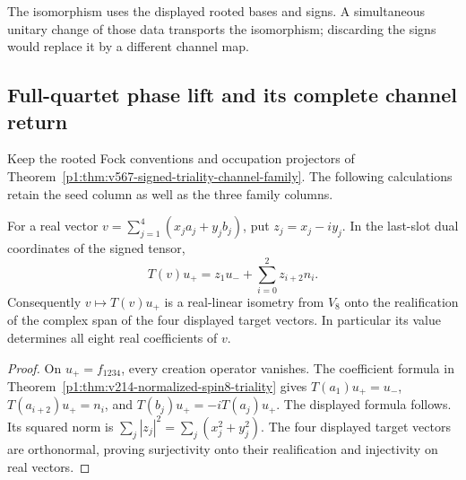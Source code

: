 \documentclass[11pt]{article}
\begin{document}
\begin{remark}
\label{p1:rem:v567-signed-triality-source-firewall}
The isomorphism uses the displayed rooted bases and signs.
A simultaneous unitary change of those data transports the isomorphism;
discarding the signs would replace it by a different channel map.
\end{remark}

\subsection{Full-quartet phase lift and its complete channel return}
\label{p1:sec:v242-signed-phase-lift}
Keep the rooted Fock conventions and occupation projectors of
Theorem~\ref{p1:thm:v567-signed-triality-channel-family}. The following
calculations retain the seed column as well as the three family columns.

\begin{lemma}
\label{p1:lem:v242-seed-real-isometry}
For a real vector
\(v=\sum_{j=1}^4(x_ja_j+y_jb_j)\), put \(z_j=x_j-iy_j\).
In the last-slot dual coordinates of the signed tensor,
\[
 \boxed{T(v)u_+=z_1u_-+\sum_{i=0}^2z_{i+2}n_i.}
\]
Consequently \(v\mapsto T(v)u_+\) is a real-linear isometry from
\(V_8\) onto the realification of the complex span of the four
displayed target vectors.
In particular its value determines all eight real coefficients of \(v\).
\end{lemma}
\begin{proof}
On \(u_+=f_{1234}\), every creation operator vanishes. The coefficient
formula in Theorem~\ref{p1:thm:v214-normalized-spin8-triality} gives
\(T(a_1)u_+=u_-\), \(T(a_{i+2})u_+=n_i\), and
\(T(b_j)u_+=-iT(a_j)u_+\). The displayed formula follows.
Its squared norm is \(\sum_j|z_j|^2=\sum_j(x_j^2+y_j^2)\).
The four displayed target vectors are orthonormal, proving surjectivity
onto their realification and injectivity on real vectors.
\end{proof}
\end{document}
